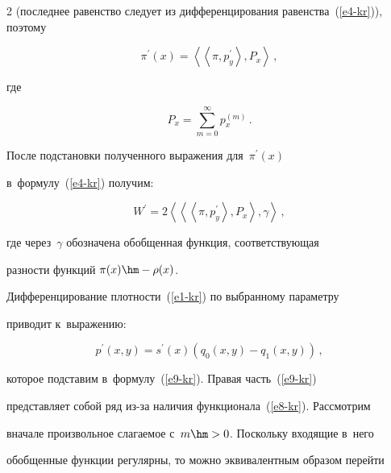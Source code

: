 \begin{multicols}{2}
(последнее равенство следует из дифференцирования равенства~(\ref{e4-kr})), поэтому


$$


\pi^\prime(x)=\left\langle \left\langle \pi, p_y^\prime\right\rangle, 


P_x\right\rangle\,,


$$


где


\begin{equation}


P_x=\sum\limits^\infty_{m=0} p_x^{(m)}\,.


\label{e8-kr}


\end{equation}


  


  После подстановки полученного выражения для~$\pi^\prime(x)$ 


в~формулу~(\ref{e4-kr}) получим:


  \begin{equation}


  W^\prime= 2\left\langle\left\langle\left\langle \pi, p_y^\prime\right\rangle, 


P_x\right\rangle, \gamma\right\rangle\,,


  \label{e9-kr}


  \end{equation}


где через~$\gamma$ обозначена обобщенная функция, со\-от\-вет\-ст\-ву\-ющая 


раз\-ности функций $\pi(x)\hm- \rho(x)$.





  Дифференцирование плот\-ности~(\ref{e1-kr}) по выбранному па\-ра\-мет\-ру 


приводит к~выражению:


  $$


  p^\prime(x,y)=s^\prime(x)\left( q_0(x,y) -q_1(x,y)\right)\,,


  $$


которое подставим в~формулу~(\ref{e9-kr}). Правая часть~(\ref{e9-kr}) 


представляет собой ряд из-за наличия функционала~(\ref{e8-kr}). Рассмотрим 


вначале произвольное сла\-га\-емое с~$m\hm> 0$. Поскольку входящие в~него 


обобщенные функции регулярны, то можно эквивалентным образом перейти 



\end{multicols}
